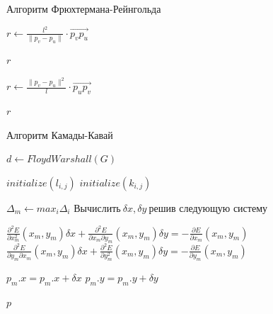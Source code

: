 \documentclass{beamer}
\begin{document}
\begin{frame}{Алгоритм Фрюхтермана-Рейнгольда}
	\begin{algorithm}[H]
		\caption{Нахождение сил притяжения и отталкивания}
    \begin{algorithmic}[1]

			\State $r \gets \frac{l^2}{\|p_v - p_u \|}  \cdot \overrightarrow{p_v p_u}  $

			\Return $r$
			\EndFunction


			\State $r \gets \frac{\|p_v - p_u \|^2}{l} \cdot \overrightarrow{p_u p_v}  $

			\Return $r$
			\EndFunction

		\end{algorithmic}
	\end{algorithm}
\end{frame}
\begin{frame}{Алгоритм Камады-Кавай}
	\begin{algorithm}[H]
		\caption{Алгоритм Камада-Кавай}
		\begin{algorithmic}

			{\ttfamily \small{
					\State $d \gets FloydWarshall(G)$

					\State $initialize(l_{i, j})$
					\State $initialize(k_{i, j})$

					\State {}

					\State $\Delta_m \gets max_i \Delta_i$
					\State $\text{Вычислить} \ \delta x, \delta y \ \text{решив следующую систему}$

					\State $ \frac{\partial^2 E}{\partial x^{2}_m}(x_m, y_m)\delta x + \frac{\partial^2 E}{\partial x_m \partial y_m}(x_m, y_m)\delta y = -\frac{\partial E}{\partial x_m}(x_m, y_m) $
					\State $ \frac{\partial^2 E}{\partial y_m \partial x_m}(x_m, y_m)\delta x + \frac{\partial^2 E}{\partial y^{2}_m}(x_m, y_m)\delta y = -\frac{\partial E}{\partial y_m}(x_m, y_m) $

					\State $p_m.x = p_m.x + \delta x$
					\State $p_m.y = p_m.y + \delta y$
					\EndWhile
					\EndWhile

					\State \Return $p$
					\EndFunction
				}}

		\end{algorithmic}
	\end{algorithm}

\end{frame}
\end{document}
